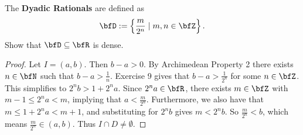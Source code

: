 \documentclass[10pt,twoside,openany]{memoir}
\begin{document}
    \begin{exercise}
        The \textbf{Dyadic Rationals} are defined as 
            \begin{equation*}
            \begin{split}
                \bfD := \left\{\frac{m}{2^n} \mid m,n \in \bfZ\right\}.
            \end{split}
            \end{equation*}
        Show that $\bfD \subseteq \bfR$ is dense.
    \end{exercise}
        {\color{red} \begin{proof}
            Let $I = (a,b)$. Then $b-a > 0$. By Archimedean Property 2 there exists $n \in \bfN$ such that $b-a > \frac{1}{n}$. Exercise 9 gives that $b - a > \frac{1}{2^n}$ for some $n \in \bfZ$. This simplifies to $2^nb > 1 + 2^na$. Since $2^na \in \bfR$, there exists $m \in \bfZ$ with $m-1 \leq 2^na < m$, implying that $a < \frac{m}{2^n}$. Furthermore, we also have that $m \leq 1 + 2^n a < m+1$, and substituting for $2^n b$ gives $m < 2^n b$. So $\frac{m}{2^n} < b$, which means $\frac{m}{2^n} \in (a,b)$. Thus $I \cap D \neq \emptyset$.
        \end{proof}}
\end{document}
